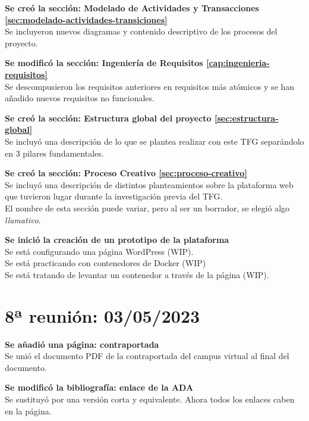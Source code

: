         \textbf{Se creó la sección: Modelado de Actividades y Transacciones \ref{sec:modelado-actividades-transiciones}} \\
        Se incluyeron nuevos diagramas y contenido descriptivo de los procesos del proyecto.
        
        \textbf{Se modificó la sección: Ingeniería de Requisitos \ref{cap:ingenieria-requisitos}} \\
        Se descompusieron los requisitos anteriores en requisitos más atómicos y se han añadido nuevos requisitos no funcionales.
    
        \textbf{Se creó la sección: Estructura global del proyecto \ref{sec:estructura-global}} \\
        Se incluyó una descripción de lo que se plantea realizar con este TFG separándolo en 3 pilares fundamentales.
    
        \textbf{Se creó la sección: Proceso Creativo \ref{sec:proceso-creativo}} \\
        Se incluyó una descripción de distintos planteamientos sobre la plataforma web que tuvieron lugar durante la investigación previa del TFG. \\
        El nombre de esta sección puede variar, pero al ser un borrador, se elegió algo \textit{llamativo}.
    
        \textbf{Se inició la creación de un prototipo de la plataforma} \\
        Se está configurando una página WordPress (WIP).\\
        Se está practicando con contenedores de Docker (WIP)\\ 
        Se está tratando de levantar un contenedor a través de la página (WIP).

        \newpage


    \section{8ª reunión: 03/05/2023}

        \textbf{Se añadió una página: contraportada} \\
        Se unió el documento PDF de la contraportada del campus virtual al final del documento.

        \textbf{Se modificó la bibliografía: enlace de la ADA \cite{articulo-ada}} \\
        Se sustituyó por una versión corta y equivalente. Ahora todos los enlaces caben en la página.

